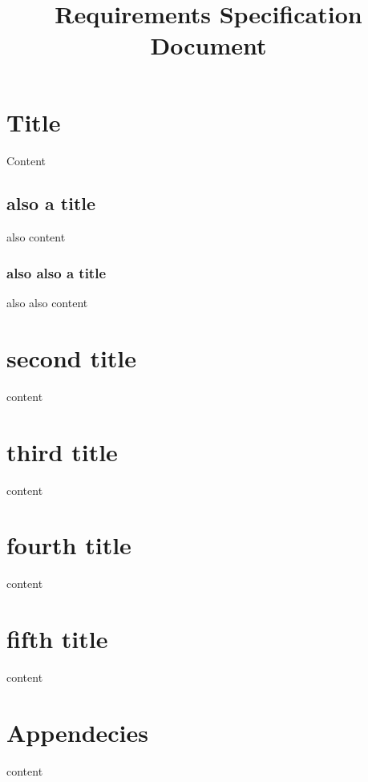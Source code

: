 \documentclass{article}
\title{Requirements Specification Document}
\begin{document}
\maketitle
\newpage
\tableofcontents
\newpage
\section{Title}
	Content
	\subsection{also a title}
        also content
        \subsubsection{also also a title}
            also also content
\section{second title}
	content
\section{third title}
    content
\section{fourth title}
    content
\section{fifth title}
	content
\section{Appendecies}
	content
\end{document}
